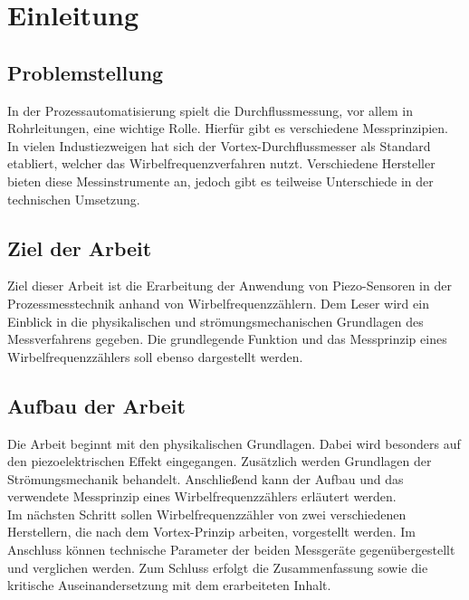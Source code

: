 \section{Einleitung}
\subsection{Problemstellung}
In der Prozessautomatisierung spielt die Durchflussmessung, vor allem in Rohrleitungen, eine wichtige Rolle. Hierfür gibt es verschiedene Messprinzipien. In vielen Industiezweigen hat sich der Vortex-Durchflussmesser als Standard etabliert, welcher das Wirbelfrequenzverfahren nutzt. Verschiedene Hersteller bieten diese Messinstrumente an, jedoch gibt es teilweise Unterschiede in der technischen Umsetzung.\autocites[vgl.][70]{Czichos}[vgl.][519]{Rohrleitung} 
\subsection{Ziel der Arbeit}
Ziel dieser Arbeit ist die Erarbeitung der Anwendung von Piezo-Sensoren in der Prozessmesstechnik anhand von Wirbelfrequenzzählern. Dem Leser wird ein Einblick in die physikalischen und strömungsmechanischen Grundlagen des Messverfahrens gegeben. Die grundlegende Funktion und das Messprinzip eines Wirbelfrequenzzählers soll ebenso dargestellt werden.\\ 

\subsection{Aufbau der Arbeit}
Die Arbeit beginnt mit den physikalischen Grundlagen. Dabei wird besonders auf den piezoelektrischen Effekt eingegangen. Zusätzlich werden Grundlagen der Strömungsmechanik behandelt. Anschließend kann der Aufbau und das verwendete Messprinzip eines Wirbelfrequenzzählers erläutert werden.\\ Im nächsten Schritt sollen Wirbelfrequenzzähler von zwei verschiedenen Herstellern, die nach dem Vortex-Prinzip arbeiten, vorgestellt werden. Im Anschluss können technische Parameter der beiden Messgeräte gegenübergestellt und verglichen werden. Zum Schluss erfolgt die Zusammenfassung sowie die kritische Auseinandersetzung mit dem erarbeiteten Inhalt.